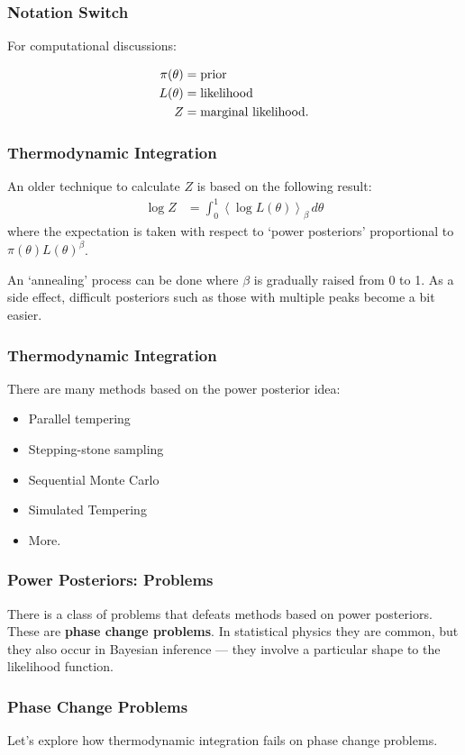 \documentclass{beamer}
\begin{document}
\begin{frame}
\frametitle{Notation Switch}
For computational discussions:

\begin{align}
\pi(\theta) &= \textnormal{prior} \\
L(\theta) &= \textnormal{likelihood} \\
Z &= \textnormal{marginal likelihood}.
\end{align}

\end{frame}


\begin{frame}
\frametitle{Thermodynamic Integration}
An older technique to calculate $Z$ is based on the following
result:
\begin{align}
\log Z &= \int_0^1 \left<\log L(\theta)\right>_\beta \, d\theta
\end{align}
\pause
where the expectation is taken with respect to `power posteriors'
proportional to $\pi(\theta)L(\theta)^\beta$. \\[0.5em]\pause

An `annealing' process can be done
where $\beta$ is gradually raised from 0 to 1. As a side effect, difficult
posteriors such as those with multiple peaks become a bit easier.

\end{frame}


\begin{frame}
\frametitle{Thermodynamic Integration}
There are many methods based on the power posterior idea:

\begin{itemize}
\item Parallel tempering
\item Stepping-stone sampling
\item Sequential Monte Carlo
\item Simulated Tempering
\item More.
\end{itemize}

\end{frame}

\begin{frame}
\frametitle{Power Posteriors: Problems}
There is a class of problems that defeats methods based on power posteriors.
These are {\bf phase change problems}. In statistical physics they are common,
but they also occur in Bayesian inference --- they involve a particular
shape to the likelihood function.


\end{frame}


\begin{frame}
\frametitle{Phase Change Problems}

Let's explore how thermodynamic integration fails on phase change problems.


\end{frame}
\end{document}
